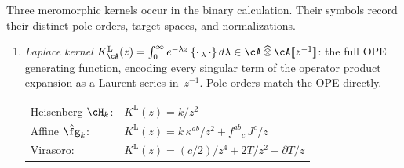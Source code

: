 \begin{remark}
\label{rem:three-r-matrices}
Three meromorphic kernels occur in the binary calculation.  Their
symbols record their distinct pole orders, target spaces, and
normalizations.
\begin{enumerate}[label=\textup{(\alph*)}]

\item \emph{Laplace kernel}
 $K^{\mathrm{L}}_\cA(z)
 = \int_0^\infty e^{-\lambda z}\,
 \{{\cdot}\,_\lambda\,{\cdot}\}\,d\lambda
 \in \cA\,\widehat\otimes\,\cA[\![z^{-1}]\!]$:
 the full OPE generating function, encoding every singular term of
 the operator product expansion as a Laurent series in~$z^{-1}$.
 Pole orders match the OPE directly.
 \begin{center}
 \renewcommand{\arraystretch}{1.1}
 \begin{tabular}{ll}
 Heisenberg $\cH_k$\textup: &
 $K^{\mathrm{L}}(z) = k/z^2$ \\
 Affine $\hat\fg_k$\textup: &
 $K^{\mathrm{L}}(z)
 = k\,\kappa^{ab}/z^2
 + {f^{ab}}_c\,J^c/z$ \\
 Virasoro\textup: &
 $K^{\mathrm{L}}(z)
 = (c/2)/z^4 + 2T/z^2 + \partial T/z$
 \end{tabular}
 \end{center}


\end{enumerate}
\end{remark}
